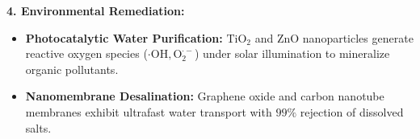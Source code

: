 \begin{theorysol}
\textbf{4. Environmental Remediation:}
\begin{itemize}
\item \textbf{Photocatalytic Water Purification:} $\text{TiO}_2$ and $\text{ZnO}$ nanoparticles generate reactive oxygen species ($\cdot\text{OH}, \text{O}_2^{\cdot-}$) under solar illumination to mineralize organic pollutants.
\item \textbf{Nanomembrane Desalination:} Graphene oxide and carbon nanotube membranes exhibit ultrafast water transport with $99\%$ rejection of dissolved salts.
\end{itemize}

\end{theorysol}
\vspace{4mm}
